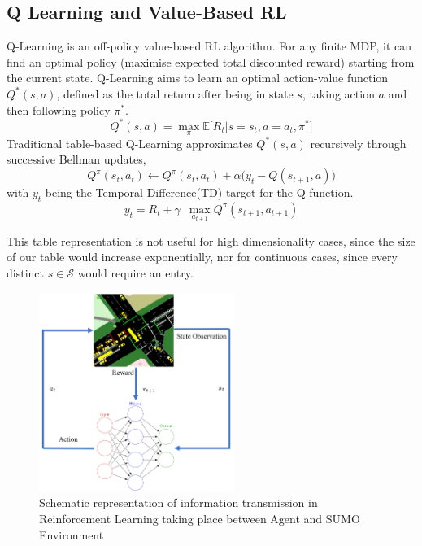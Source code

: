 \documentclass[conference]{IEEEtran}
\begin{document}
\subsection{Q Learning and Value-Based RL}
Q-Learning\cite{watkins} is an off-policy value-based RL algorithm. For any finite MDP, it can find an optimal policy (maximise expected total discounted reward) starting from the current state\cite{melo}.
Q-Learning aims to learn an optimal action-value function $Q^*(s,a)$, defined as the total return after being in state $s$, taking action $a$ and then following policy $\pi^*$. %
\begin{equation}
Q^*(s,a) = \max_{\pi} \mathbb{E} \big[ R_t | s=s_t, a=a_t, \pi^* \big]
\label{eq:qlearning}
\end{equation}
Traditional table-based Q-Learning approximates $Q^*(s,a)$ recursively through successive Bellman updates,
\begin{equation}
Q^{\pi}(s_t,a_t) \leftarrow Q^{\pi}(s_t,a_t) + \alpha \big( y_t - Q(s_{t+1},a) \big)
\label{eq:bellmanupdate}
\end{equation}
with $y_t$ being the Temporal Difference(TD) target for the Q-function.
\begin{equation}
y_t = R_t + \gamma \,\,\, \max_{a_{t+1}} Q^{\pi}(s_{t+1},a_{t+1})
\end{equation}

This table representation is not useful for high dimensionality cases, since the size of our table would increase exponentially, nor for continuous cases, since every distinct $s\in\mathcal{S}$ would require an entry.

\begin{figure}                                                
\centering                                                    
\includegraphics[width=2.5in]{schematic_pp2.png}                                    
\caption{Schematic representation of information transmission in Reinforcement Learning taking place between Agent and SUMO Environment}                                  
\label{rl}                                               
\end{figure}  
\end{document}
